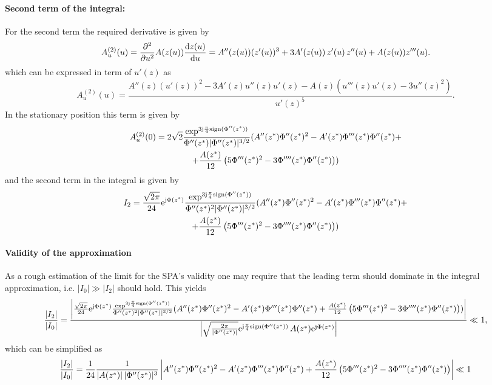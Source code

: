 \documentclass[11pt]{article}
\begin{document}
\paragraph{Second term of the integral:}
For the second term the required derivative is given by
\begin{equation}
    \small
    A^{(2)}_u(u) = \frac{\partial^2}{\partial u^2} A(z(u))\frac{\mathrm{d} z(u)}{\mathrm{d} u} = A''(z(u)) (z'(u))^3 + 3A'(z(u)) \, z'(u) \,z''(u) + A(z(u)) z'''(u).
\end{equation}
which can be expressed in term of $u'(z)$ as
\begin{equation}
    A^{(2)}_u(u) = \frac{ A''(z) (u'(z))^2 - 3 A'(z)u''(z) u'(z) - A(z)\left( u'''(z) u'(z)- 3u''(z)^2 \right) 
    }{u'(z)^5}.
\end{equation}
In the stationary position this term is given by
\begin{multline}
    \small
    A^{(2)}_u(0) = 2 \sqrt{2} \frac{\exp^{3\mathrm{j} \frac{\pi}{4}\text{sign}(\Phi''(z^*)) }}{\Phi''(z^*) |\Phi''(z^*)|^{3/2}}(
    A''(z^*) \Phi''(z^*)^2 - A'(z^*)\Phi'''(z^*) \Phi''(z^*) + \\
    + \frac{A(z^*)}{12} \left(  5 \Phi'''(z^*)^2 -3\Phi''''(z^*)\Phi''(z^*) \right)
    )
\end{multline}
and the second term in the integral is given by
\begin{multline}
    \small
    I_2 = \frac{\sqrt{2\pi}}{24} \mathrm{e}^{\mathrm{j} \Phi(z^*)} \frac{\exp^{3\mathrm{j} \frac{\pi}{4}\text{sign}(\Phi''(z^*)) }}{\Phi''(z^*)^2 |\Phi''(z^*)|^{3/2}}(
    A''(z^*) \Phi''(z^*)^2 - A'(z^*)\Phi'''(z^*) \Phi''(z^*) + \\
    + \frac{A(z^*)}{12} \left(  5 \Phi'''(z^*)^2 -3\Phi''''(z^*)\Phi''(z^*) \right)
    )
\end{multline}


\paragraph{Validity of the approximation}
As a rough estimation of the limit for the SPA's validity one may require that the leading term should dominate in the integral approximation, i.e. $|I_0| \gg |I_2|$ should hold.
This yields 
\begin{equation}
    \scriptsize
    \frac{|I_2|}{|I_0|} = \frac{\left|\frac{\sqrt{2\pi}}{24} \mathrm{e}^{\mathrm{j} \Phi(z^*)} \frac{\exp^{3\mathrm{j} \frac{\pi}{4}\text{sign}(\Phi''(z^*)) }}{\Phi''(z^*)^2 |\Phi''(z^*)|^{3/2}}(
        A''(z^*) \Phi''(z^*)^2 - A'(z^*)\Phi'''(z^*) \Phi''(z^*) + 
        \frac{A(z^*)}{12} \left(  5 \Phi'''(z^*)^2 -3\Phi''''(z^*)\Phi''(z^*) \right)
        )\right|}{\left|
            \sqrt{\frac{2 \pi}{\left| \Phi''(z^*) \right|}} \mathrm{e}^{\mathrm{j} \frac{\pi}{4} \text{sign}(\Phi''(z^*))} \, A(z^*) \mathrm{e}^{ \mathrm{j} \Phi(z^*) }
        \right|} \ll 1,
\end{equation}
which can be simplified as
\begin{equation}
    \scriptsize
    \frac{|I_2|}{|I_0|} = \frac{1}{24} \frac{1}{\left|A(z^*) \right| |\Phi''(z^*)|^3 } \left|
        A''(z^*) \Phi''(z^*)^2 - A'(z^*)\Phi'''(z^*) \Phi''(z^*) + 
        \frac{A(z^*)}{12} \left(  5 \Phi'''(z^*)^2 -3\Phi''''(z^*)\Phi''(z^*)  \right) \right|
         \ll 1
        \label{eq:SPAvalidity}
\end{equation}
\end{document}
